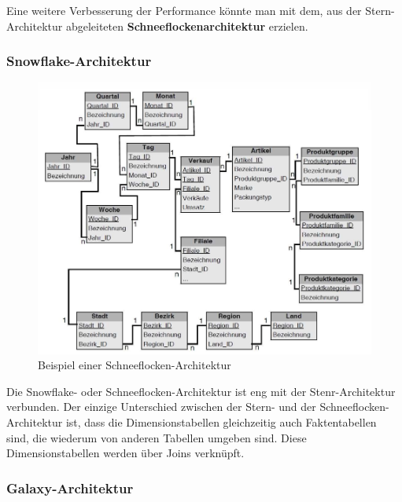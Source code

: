 \documentclass[a4paper, 11pt, nofootinbib]{article}
\begin{document}
\vspace{10px}

\noindent Eine weitere Verbesserung der Performance könnte man mit dem, aus der Stern-Architektur abgeleiteten \textbf{Schneeflockenarchitektur} erzielen.

\newpage

\subsubsection{Snowflake-Architektur}
\begin{figure}
	\centering
	\includegraphics[keepaspectratio=true,height=18\baselineskip]{snowflake.PNG}
	\caption{Beispiel einer Schneeflocken-Architektur}
	\label{fig:snowflake}
\end{figure}

Die Snowflake- oder Schneeflocken-Architektur ist eng mit der Stenr-Architektur verbunden. Der einzige Unterschied zwischen der Stern- und der Schneeflocken-Architektur ist, dass die Dimensionstabellen gleichzeitig auch Faktentabellen sind, die wiederum von anderen Tabellen umgeben sind. Diese Dimensionstabellen werden über Joins verknüpft. 

\subsubsection{Galaxy-Architektur}
\end{document}
